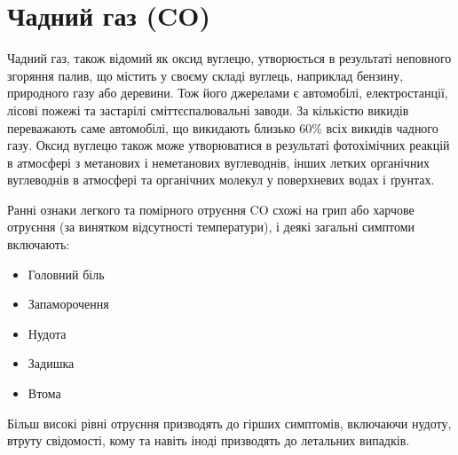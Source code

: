 \section{Чадний газ (CO)}


Чадний газ, також відомий як оксид вуглецю, утворюється в результаті неповного згоряння палив, що містить у своєму складі вуглець, наприклад бензину, природного газу або деревини. 
Тож його джерелами є автомобілі, електростанції, лісові пожежі та застарілі сміттєспалювальні заводи.
За кількістю викидів переважають саме автомобілі, що викидають близько 60\% всіх викидів чадного газу.\cite{us_epa_basic_2016}
Оксид вуглецю також може утворюватися в результаті фотохімічних реакцій в атмосфері з метанових і неметанових вуглеводнів, інших летких органічних вуглеводнів в атмосфері та органічних молекул у поверхневих водах і ґрунтах. \cite{noauthor_carbon_nodate}

Ранні ознаки легкого та помірного отруєння CO схожі на грип або харчове отруєння (за винятком відсутності температури), і деякі загальні симптоми включають:

\begin{multicols}{2}
    \begin{itemize}
        \item Головний біль
        \item Запаморочення 
        \item Нудота
        \item Задишка 
        \item Втома 
    \end{itemize}
\end{multicols}

Більш високі рівні отруєння призводять до гірших симптомів, включаючи нудоту, втруту свідомості, кому та навіть іноді призводять до летальних випадків.\cite{meersens_carbon_2022}
